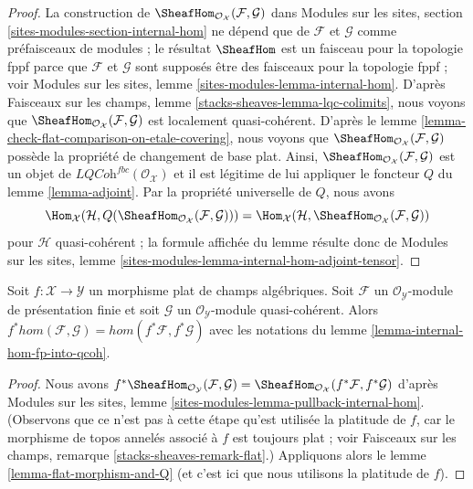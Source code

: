 \begin{proof}
La construction de
$\SheafHom_{\mathcal{O}_\mathcal{X}}(\mathcal{F}, \mathcal{G})$ dans
Modules sur les sites, section \ref{sites-modules-section-internal-hom}
ne dépend que de $\mathcal{F}$ et $\mathcal{G}$ comme préfaisceaux
de modules ; le résultat $\SheafHom$ est un faisceau pour la topologie
fppf parce que $\mathcal{F}$ et $\mathcal{G}$ sont supposés être des
faisceaux pour la topologie fppf ; voir
Modules sur les sites, lemme \ref{sites-modules-lemma-internal-hom}.
D'après Faisceaux sur les champs, lemme \ref{stacks-sheaves-lemma-lqc-colimits},
nous voyons que $\SheafHom_{\mathcal{O}_\mathcal{X}}(\mathcal{F}, \mathcal{G})$
est localement quasi-cohérent.
D'après le lemme \ref{lemma-check-flat-comparison-on-etale-covering},
nous voyons que $\SheafHom_{\mathcal{O}_\mathcal{X}}(\mathcal{F}, \mathcal{G})$
possède la propriété de changement de base plat. Ainsi,
$\SheafHom_{\mathcal{O}_\mathcal{X}}(\mathcal{F}, \mathcal{G})$
est un objet de $\textit{LQCoh}^{fbc}(\mathcal{O}_\mathcal{X})$
et il est légitime de lui appliquer le foncteur $Q$ du lemme \ref{lemma-adjoint}.
Par la propriété universelle de $Q$, nous avons
$$
\Hom_\mathcal{X}(\mathcal{H},
Q(\SheafHom_{\mathcal{O}_\mathcal{X}}(\mathcal{F}, \mathcal{G}))) =
\Hom_\mathcal{X}(\mathcal{H},
\SheafHom_{\mathcal{O}_\mathcal{X}}(\mathcal{F}, \mathcal{G}))
$$
pour $\mathcal{H}$ quasi-cohérent ; la formule affichée
du lemme résulte donc de Modules sur les sites, lemme
\ref{sites-modules-lemma-internal-hom-adjoint-tensor}.
\end{proof}

\begin{lemma}
\label{lemma-flat-morphism-and-hom}
Soit $f : \mathcal{X} \to \mathcal{Y}$ un morphisme plat de champs algébriques.
Soit $\mathcal{F}$ un
$\mathcal{O}_\mathcal{Y}$-module de présentation finie et soit
$\mathcal{G}$ un $\mathcal{O}_\mathcal{Y}$-module quasi-cohérent.
Alors $f^*hom(\mathcal{F}, \mathcal{G}) = hom(f^*\mathcal{F}, f^*\mathcal{G})$
avec les notations du lemme \ref{lemma-internal-hom-fp-into-qcoh}.
\end{lemma}

\begin{proof}
Nous avons $f^*\SheafHom_{\mathcal{O}_\mathcal{Y}}(\mathcal{F}, \mathcal{G}) =
\SheafHom_{\mathcal{O}_\mathcal{X}}(f^*\mathcal{F}, f^*\mathcal{G})$
d'après Modules sur les sites, lemme \ref{sites-modules-lemma-pullback-internal-hom}.
(Observons que ce n'est pas à cette étape qu'est utilisée la platitude de $f$,
car le morphisme de topos annelés associé à $f$ est toujours plat ; voir
Faisceaux sur les champs, remarque \ref{stacks-sheaves-remark-flat}.)
Appliquons alors le lemme \ref{lemma-flat-morphism-and-Q} (et c'est ici que nous utilisons
la platitude de $f$).
\end{proof}








